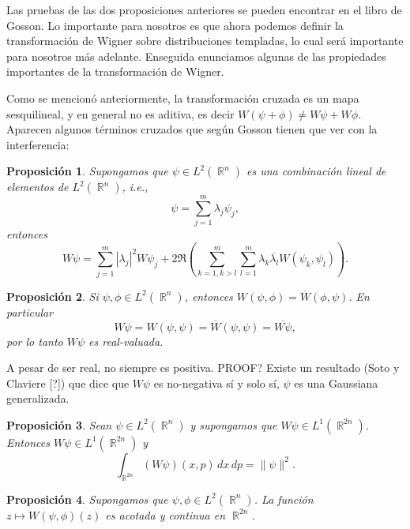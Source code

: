 \documentclass[a4paper]{report}
\DeclareMathOperator{\R}{\mathbb{R}}
\newtheorem{proposition}{Proposición}
\begin{document}
  Las pruebas de las dos proposiciones anteriores se pueden
  encontrar en el libro de Gosson. Lo importante para
  nosotros es que ahora podemos definir la transformación de
  Wigner sobre distribuciones templadas, lo cual será
  importante para nosotros más adelante. Enseguida
  enunciamos algunas de las propiedades importantes de la
  transformación de Wigner.

  Como se mencionó anteriormente, la transformación cruzada
  es un mapa sesquilineal, y en general no es aditiva, es
  decir $W(\psi + \phi) \neq W\psi + W\phi$. Aparecen
  algunos términos cruzados que según Gosson tienen que ver
  con la interferencia:
  \begin{proposition}
    Supongamos que $\psi \in L^2(\R^{n})$ es una combinación
    lineal de elementos de $L^2(\R^{n})$, i.e.,
    \begin{equation}
      \psi = \sum_{j=1}^{m} \lambda_j \psi_j,
    \end{equation}
    entonces
    \begin{equation}
      W\psi
      = \sum_{j=1}^{m} |\lambda_j|^2 W\psi_j
      + 2 \Re\left(\sum_{k=1,k > l}^{m} \sum_{l=1}^{m}
      \lambda_k \overline{\lambda_l} W(\psi_k,
    \psi_l)\right).
    \end{equation}
  \end{proposition}

  \begin{proposition}
    Si $\psi, \phi \in L^2(\R^{n})$, entonces $W(\psi,\phi)
    = \overline{W}(\phi,\psi)$. En particular
    \[
      W\psi
      = W(\psi,\psi)
      = \overline{W}(\psi,\psi)
      = \overline{W\psi},
    \] 
    por lo tanto $W\psi$ es real-valuada. 
  \end{proposition}

  A pesar de ser real, no siempre es positiva.  PROOF?
  Existe un resultado (Soto y Claviere [?]) que dice que
  $W\psi$ es no-negativa sí y solo sí, $\psi$ es una
  Gaussiana generalizada.
  \begin{proposition}
    Sean $\psi \in L^2(\R^{n})$ y supongamos que $W\psi \in
    L^{1}(\R^{2n})$. Entonces $W\psi \in L^{1}(\R^{2n})$ y
    \begin{equation}
      \int_{\R^{2n}} (W\psi)(x,p) \, dx \, dp 
      = \|\psi\|^2.
    \end{equation}
  \end{proposition}

  \begin{proposition}
    Supongamos que $\psi, \phi \in L^2(\R^{n})$. La función
    $z \mapsto W(\psi,\phi)(z)$ es acotada y continua en
    $\R^{2n}$.
  \end{proposition}
\end{document}
